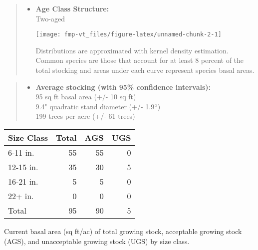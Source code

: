 \documentclass[]{tufte-handout}
\providecommand{\tightlist}{%
  \setlength{\itemsep}{0pt}\setlength{\parskip}{0pt}}
\begin{document}
\begin{quote}
\begin{itemize}
\tightlist
\item
  \textbf{Age Class Structure:}\\
  \vspace{2pt} Two-aged\\

  \begin{marginfigure}
  \texttt{[image: fmp-vt\_files/figure-latex/unnamed-chunk-2-1]} \caption[Distributions are approximated with kernel density estimation]{Distributions are approximated with kernel density estimation. Common species are those that account for at least 8 percent of the total stocking and areas under each curve represent species basal areas.}\label{fig:unnamed-chunk-2}
  \end{marginfigure}
\end{itemize}
\end{quote}

\begin{quote}
\begin{itemize}
\tightlist
\item
  \textbf{Average stocking (with 95\% confidence intervals):}\\
  \vspace{2pt} 95 sq ft basal area (+/- 10 sq ft)\\
  9.4" quadratic stand diameter (+/- 1.9``)\\
  199 trees per acre (+/- 61 trees)\\
  \vspace{8pt}
\end{itemize}
\end{quote}

\begin{tabular}{lrrr}
\toprule
Size Class & Total & AGS & UGS\\
\midrule
6-11 in. & 55 & 55 & 0\\
12-15 in. & 35 & 30 & 5\\
16-21 in. & 5 & 5 & 0\\
22+ in. & 0 & 0 & 0\\
Total & 95 & 90 & 5\\
\bottomrule
\end{tabular}

\vspace{2pt}
\footnotesize\parbox{200pt}{Current basal area (sq ft/ac) of total growing stock, acceptable growing stock (AGS), and unacceptable growing stock (UGS) by size class.}\normalsize
\end{document}
